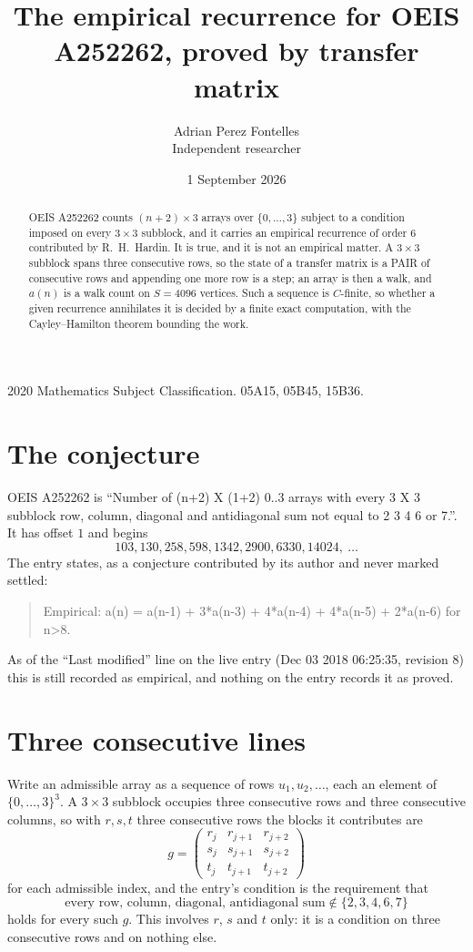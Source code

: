 \documentclass[11pt,a4paper]{article}
\title{The empirical recurrence for OEIS A252262, proved by transfer matrix}
\author{Adrian Perez Fontelles\\ \small Independent researcher}
\date{1 September 2026}
\theoremstyle{plain}
\theoremstyle{definition}
\begin{document}
\maketitle

\begin{abstract}
OEIS A252262 counts $(n+2)\times3$ arrays over $\{0,\dots,3\}$ subject to a condition imposed on
every $3\times3$ subblock, and it carries an empirical recurrence of order $6$
contributed by R.~H.~Hardin. It is true, and it is not an empirical matter. A $3\times3$
subblock spans three consecutive rows, so the state of a transfer matrix is a PAIR of
consecutive rows and appending one more row is a step; an array is then a walk, and
$a(n)$ is a walk count on $S=4096$ vertices. Such a sequence is $C$-finite, so whether a given
recurrence annihilates it is decided by a finite exact computation, with the Cayley--Hamilton
theorem bounding the work.
\end{abstract}

\noindent\small 2020 Mathematics Subject Classification. 05A15, 05B45, 15B36.\normalsize

\section{The conjecture}

OEIS A252262 is ``Number of (n+2) X (1+2) 0..3 arrays with every 3 X 3 subblock row, column, diagonal and antidiagonal sum not equal to 2 3 4 6 or 7.''. It has offset $1$ and begins
\[
103, 130, 258, 598, 1342, 2900, 6330, 14024,\ \dots
\]
The entry states, as a conjecture contributed by its author and never marked settled:
\begin{quote}
Empirical: a(n) = a(n-1) + 3*a(n-3) + 4*a(n-4) + 4*a(n-5) + 2*a(n-6) for n>8.
\end{quote}
As of the ``Last modified'' line on the live entry (Dec 03 2018 06:25:35, revision 8) this is still
recorded as empirical, and nothing on the entry records it as proved.

\section{Three consecutive lines}

Write an admissible array as a sequence of rows $u_1,u_2,\dots$, each an element of
$\{0,\dots,3\}^{3}$. A $3\times3$ subblock occupies three consecutive rows and
three consecutive columns, so with $r,s,t$ three consecutive rows the blocks it
contributes are
\[
g=\begin{pmatrix}r_j&r_{j+1}&r_{j+2}\\ s_j&s_{j+1}&s_{j+2}\\ t_j&t_{j+1}&t_{j+2}\end{pmatrix}
\]
for each admissible index, and the entry's condition is the requirement that
\[
\text{every row, column, diagonal, antidiagonal sum} \notin \{2,3,4,6,7\}
\]
holds for every such $g$. This involves $r$, $s$ and $t$ only: it is a condition on
three consecutive rows and on nothing else.
\end{document}
